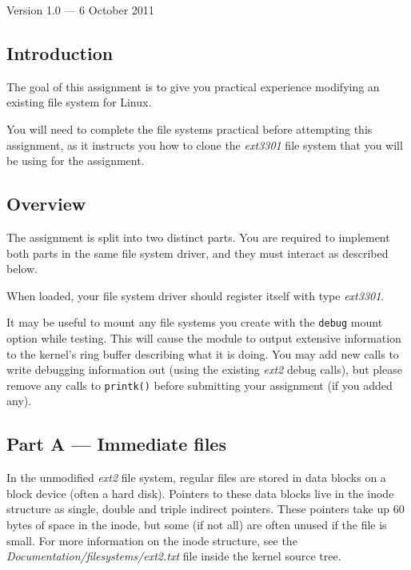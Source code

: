 \documentclass[12pt,a4paper]{article}
\begin{document}


\begin{center}
Version 1.0 --- 6 October 2011
\end{center}

\subsection*{Introduction}

The goal of this assignment is to give you practical experience modifying
an existing file system for Linux.

You will need to complete the file systems practical before attempting this
assignment, as it instructs you how to clone the \textit{ext3301} file system
that you will be using for the assignment.



\subsection*{Overview}

The assignment is split into two distinct parts. You are required to implement
both parts in the same file system driver, and they must interact as described
below.

When loaded, your file system driver should register itself with type
\textit{ext3301}.

It may be useful to mount any file systems you create with the \texttt{debug}
mount option while testing. This will cause the module to output extensive
information to the kernel's ring buffer describing what it is doing. You may
add new calls to write debugging information out (using the existing
\textit{ext2} debug calls), but please remove any calls to \texttt{printk()}
before submitting your assignment (if you added any).

\subsection*{Part A --- Immediate files}

In the unmodified \textit{ext2} file system, regular files are stored in data
blocks on a block device (often a hard disk). Pointers to these data blocks live
in the inode structure as single, double and triple indirect pointers. These
pointers take up 60 bytes of space in the inode, but some (if not all) are
often unused if the file is small. For more information on the inode structure,
see the \textit{Documentation/filesystems/ext2.txt} file inside the kernel
source tree.
\end{document}
